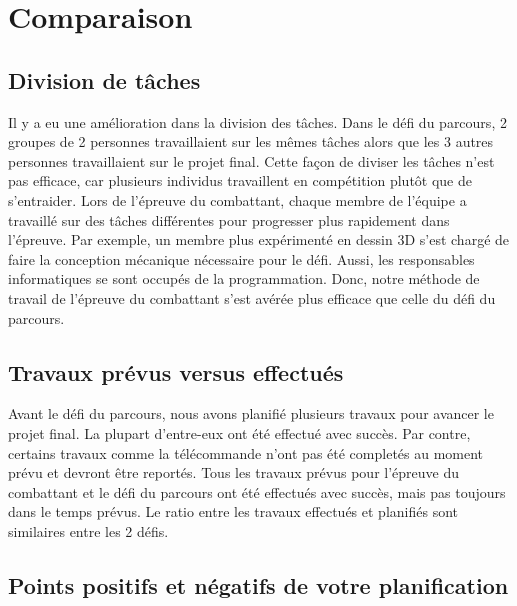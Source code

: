 \section{Comparaison}

\subsection{Division de tâches}

\begin{spacing}{1.5}
    Il y a eu une amélioration dans la division des tâches.
    Dans le défi du parcours, 2 groupes de 2 personnes travaillaient sur les mêmes tâches alors que les 3 autres personnes travaillaient sur le projet final.
    Cette façon de diviser les tâches n'est pas efficace, car plusieurs individus travaillent en compétition plutôt que de s'entraider.
    Lors de l'épreuve du combattant, chaque membre de l'équipe a travaillé sur des tâches différentes pour progresser plus rapidement dans l'épreuve.
    Par exemple, un membre plus expérimenté en dessin 3D s'est chargé de faire la conception mécanique nécessaire pour le défi.
    Aussi, les responsables informatiques se sont occupés de la programmation.
    Donc, notre méthode de travail de l'épreuve du combattant s'est avérée plus efficace que celle du défi du parcours.
\end{spacing}

\subsection{Travaux prévus versus effectués}

\begin{spacing}{1.5}
    Avant le défi du parcours, nous avons planifié plusieurs travaux pour avancer le projet final.
    La plupart d'entre-eux ont été effectué avec succès.
    Par contre, certains travaux comme la télécommande n'ont pas été completés au moment prévu et devront être reportés.
    Tous les travaux prévus pour l'épreuve du combattant et le défi du parcours ont été effectués avec succès, mais pas toujours dans le temps prévus.
    Le ratio entre les travaux effectués et planifiés sont similaires entre les 2 défis.
\end{spacing}

\subsection{Points positifs et négatifs de votre planification}

